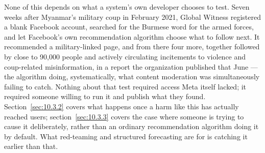 None of this depends on what a system's own developer chooses to test. Seven weeks after Myanmar's military coup in February 2021, Global Witness registered a blank Facebook account, searched for the Burmese word for the armed forces, and let Facebook's own recommendation algorithm choose what to follow next. It recommended a military-linked page, and from there four more, together followed by close to 90,000 people and actively circulating incitements to violence and coup-related misinformation, in a report the organization published that June \autocite{globalwitness2021algorithm} — the algorithm doing, systematically, what content moderation was simultaneously failing to catch. Nothing about that test required access Meta itself lacked; it required someone willing to run it and publish what they found. Section~\ref{sec:10.3.2} covers what happens once a harm like this has actually reached users; section~\ref{sec:10.3.3} covers the case where someone is trying to cause it deliberately, rather than an ordinary recommendation algorithm doing it by default. What red-teaming and structured forecasting are for is catching it earlier than that.

